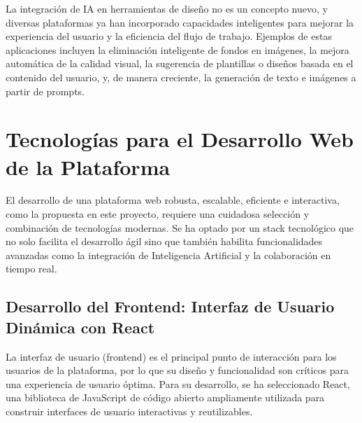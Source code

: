 \documentclass[12pt,a4paper]{report}
\begin{document}
La integración de IA en herramientas de diseño no es un concepto nuevo, y diversas plataformas ya han incorporado capacidades inteligentes para mejorar la experiencia del usuario y la eficiencia del flujo de trabajo. Ejemplos de estas aplicaciones incluyen la eliminación inteligente de fondos en imágenes, la mejora automática de la calidad visual, la sugerencia de plantillas o diseños basada en el contenido del usuario, y, de manera creciente, la generación de texto e imágenes a partir de prompts.

\section{Tecnologías para el Desarrollo Web de la Plataforma}

El desarrollo de una plataforma web robusta, escalable, eficiente e interactiva, como la propuesta en este proyecto, requiere una cuidadosa selección y combinación de tecnologías modernas. Se ha optado por un stack tecnológico que no solo facilita el desarrollo ágil sino que también habilita funcionalidades avanzadas como la integración de Inteligencia Artificial y la colaboración en tiempo real.

\subsection{Desarrollo del Frontend: Interfaz de Usuario Dinámica con React}

La interfaz de usuario (frontend) es el principal punto de interacción para los usuarios de la plataforma, por lo que su diseño y funcionalidad son críticos para una experiencia de usuario óptima. Para su desarrollo, se ha seleccionado React, una biblioteca de JavaScript de código abierto ampliamente utilizada para construir interfaces de usuario interactivas y reutilizables.
\end{document}
